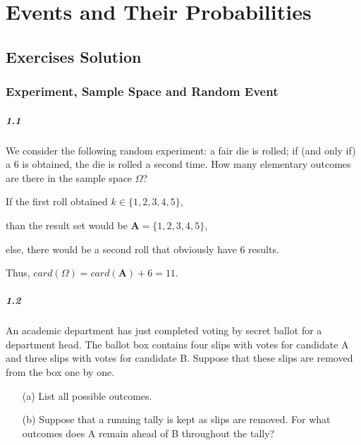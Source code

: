 



\chapter{Events and Their Probabilities}
\newpage %

\section{Exercises Solution}

\subsection{Experiment, Sample Space and Random Event}

\paragraph{1.1}
We consider the following random experiment: a fair die is rolled; if (and only if) a 6 is obtained, the die is rolled a second time. How many elementary outcomes are there in the sample space $\Omega$?
 
\begin{solution}

If the first roll obtained $k\in \{1,2,3,4,5\}$, \par
than the result set would be $\mathbf{A} = \{1,2,3,4,5\}$,\par
else, there would be a second roll that obviously have 6 results.\par
Thus, $card(\Omega) = card(\mathbf{A}) + 6 = 11$.

\end{solution}

\paragraph{1.2}
An academic department has just completed voting by secret ballot for a department head. The ballot box contains four slips with votes for candidate A and three slips with votes for candidate B. Suppose that these slips are removed from the box one by one.
\begin{itemize}
    \item[(a)] List all possible outcomes.
    \item[(b)] Suppose that a running tally is kept as slips are removed. For what outcomes does A remain ahead of B throughout the tally?
\end{itemize}

